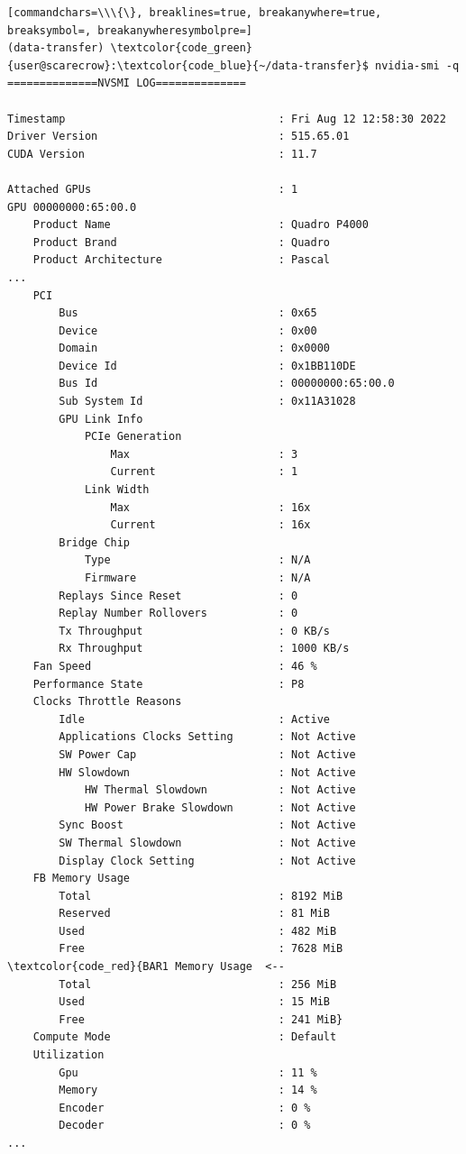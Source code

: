 \documentclass[a4paper,onecolumn]{article}
\begin{document}
\begin{Verbatim}[commandchars=\\\{\}, breaklines=true, breakanywhere=true, breaksymbol=, breakanywheresymbolpre=]
(data-transfer) \textcolor{code_green}{user@scarecrow}:\textcolor{code_blue}{~/data-transfer}$ nvidia-smi -q
==============NVSMI LOG==============

Timestamp                                 : Fri Aug 12 12:58:30 2022
Driver Version                            : 515.65.01
CUDA Version                              : 11.7

Attached GPUs                             : 1
GPU 00000000:65:00.0
    Product Name                          : Quadro P4000
    Product Brand                         : Quadro
    Product Architecture                  : Pascal
...
    PCI
        Bus                               : 0x65
        Device                            : 0x00
        Domain                            : 0x0000
        Device Id                         : 0x1BB110DE
        Bus Id                            : 00000000:65:00.0
        Sub System Id                     : 0x11A31028
        GPU Link Info
            PCIe Generation
                Max                       : 3
                Current                   : 1
            Link Width
                Max                       : 16x
                Current                   : 16x
        Bridge Chip
            Type                          : N/A
            Firmware                      : N/A
        Replays Since Reset               : 0
        Replay Number Rollovers           : 0
        Tx Throughput                     : 0 KB/s
        Rx Throughput                     : 1000 KB/s
    Fan Speed                             : 46 %
    Performance State                     : P8
    Clocks Throttle Reasons
        Idle                              : Active
        Applications Clocks Setting       : Not Active
        SW Power Cap                      : Not Active
        HW Slowdown                       : Not Active
            HW Thermal Slowdown           : Not Active
            HW Power Brake Slowdown       : Not Active
        Sync Boost                        : Not Active
        SW Thermal Slowdown               : Not Active
        Display Clock Setting             : Not Active
    FB Memory Usage
        Total                             : 8192 MiB
        Reserved                          : 81 MiB
        Used                              : 482 MiB
        Free                              : 7628 MiB
\textcolor{code_red}{BAR1 Memory Usage  <-- 
        Total                             : 256 MiB
        Used                              : 15 MiB
        Free                              : 241 MiB}
    Compute Mode                          : Default
    Utilization
        Gpu                               : 11 %
        Memory                            : 14 %
        Encoder                           : 0 %
        Decoder                           : 0 %
...
\end{Verbatim}
\end{document}
